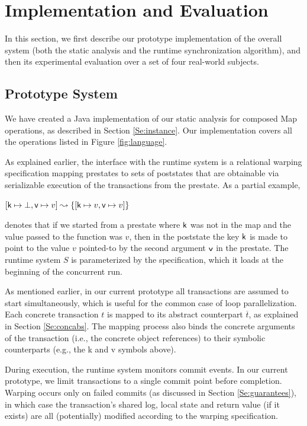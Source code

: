 \section{Implementation and Evaluation}\label{Se:experiments}

In this section, we first describe our prototype implementation of the overall system (both the static analysis and the runtime synchronization algorithm), and then its experimental evaluation over a set of four real-world subjects. 

\subsection{Prototype System}

We have created a Java implementation of our static analysis for composed {\sf Map} operations, as described  in Section \ref{Se:instance}. Our implementation covers all the operations listed in Figure \ref{fig:language}.  

As explained earlier, the interface with the runtime system is a relational warping specification mapping prestates to sets of poststates that are obtainable via serializable execution of the transactions from the prestate. As a partial example, 
\begin{center}
$[ {\sf k} \mapsto \bot , {\sf v} \mapsto v ] \leadsto \{ [ {\sf k} \mapsto v , {\sf v} \mapsto v ] \}$
\end{center}
denotes that if we started from a prestate where ${\sf k}$ was not in the map and the value passed to the function was $v$, then in the poststate the key ${\sf k}$ is made to point to the value $v$ pointed-to by the second argument ${\sf v}$ in the prestate.
%
The runtime system $S$ is parameterized by the specification, which it loads at the beginning of the concurrent run. 

As mentioned earlier, in our current prototype all transactions are assumed to start simultaneously, which is useful for the common case of loop parallelization. Each concrete transaction $t$ is mapped to its abstract counterpart $\overline{t}$, as explained in Section \ref{Se:concabs}. The mapping process also binds the concrete arguments of the transaction (i.e., the concrete object references) to their symbolic counterparts (e.g., the {\sf k} and {\sf v} symbols above). 

During execution, the runtime system monitors commit events. In our current prototype, we limit transactions to a single commit point before completion. Warping occurs only on failed commits (as discussed in Section \ref{Se:guarantees}), in which case the transaction's shared log, local state and return value (if it exists) are all (potentially) modified according to the warping specification. 

